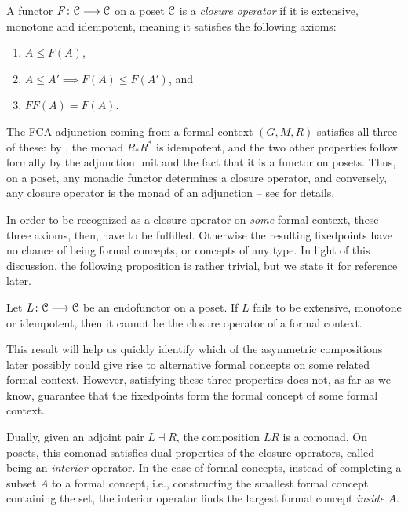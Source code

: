\begin{definition}
    A functor $F\colon \EuScript{C}\longrightarrow \EuScript{C}$ on a poset $\EuScript{C}$ is a \emph{closure operator} if it is extensive, monotone and idempotent, meaning it satisfies the following axioms:
\begin{enumerate}
    \item $A\leq F(A)$,
    \item $A\leq A' \implies F(A)\leq F(A')$, and
    \item $FF(A) = F(A)$.
\end{enumerate}
\end{definition}

The FCA adjunction coming from a formal context $(G,M,R)$ satisfies all three of these: by \cite[2.1.11]{jarvis_2025}, the monad $R_*R^*$ is idempotent, and the two other properties follow formally by the adjunction unit and the fact that it is a functor on posets. Thus, on a poset, any monadic functor determines a closure operator, and conversely, any closure operator is the monad of an adjunction -- see \cite[Chapter 7]{davey-priestley_2002} for details. 

In order to be recognized as a closure operator on \emph{some} formal context, these three axioms, then, have to be fulfilled. Otherwise the resulting fixedpoints have no chance of being formal concepts, or concepts of any type. In light of this discussion, the following proposition is rather trivial, but we state it for reference later.

\begin{proposition}
    \label{prop:axioms_for_closure}
    Let $L\colon \EuScript{C} \longrightarrow \EuScript{C}$ be an endofunctor on a poset. If $L$ fails to be extensive, monotone or idempotent, then it cannot be the closure operator of a formal context. 
\end{proposition}

This result will help us quickly identify which of the asymmetric compositions later possibly could give rise to alternative formal concepts on some related formal context. However, satisfying these three properties does not, as far as we know, guarantee that the fixedpoints form the formal concept of some formal context. 

\begin{remark}
    Dually, given an adjoint pair $L\dashv R$, the composition $LR$ is a comonad. On posets, this comonad satisfies dual properties of the closure operators, called being an \emph{interior} operator. In the case of formal concepts, instead of completing a subset $A$ to a formal concept, i.e., constructing the smallest formal concept containing the set, the interior operator finds the largest formal concept \emph{inside} $A$. 
\end{remark}


